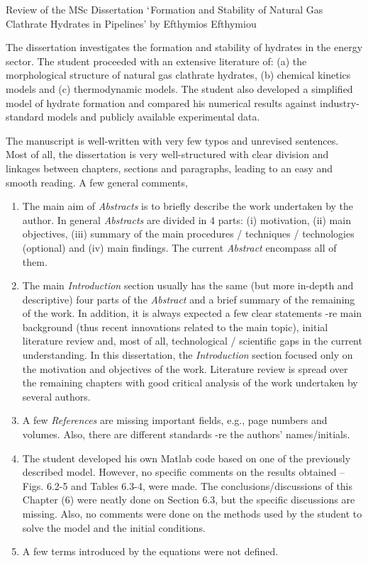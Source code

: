 \documentclass[14pt,twoside]{report}
\begin{document}
\begin{center}
{\Large Review of the MSc Dissertation $\lq$Formation and Stability of Natural Gas Clathrate Hydrates in Pipelines' by Efthymios Efthymiou}
\end{center}

\medskip

The dissertation investigates the formation and stability of hydrates in the energy sector. The student proceeded with an extensive literature of: (a) the morphological structure of natural gas clathrate hydrates, (b) chemical kinetics models and (c) thermodynamic models. The student also developed a simplified model of hydrate formation and compared his numerical results against industry-standard models and publicly available experimental data.

The manuscript is well-written with very few typos and unrevised sentences. Most of all, the dissertation is very well-structured with clear division and linkages between chapters, sections and paragraphs, leading to an easy and smooth reading. A few general comments,
\begin{enumerate}
%
\item The main aim of {\it Abstracts} is to briefly describe the work undertaken by the author. In general {\it Abstracts} are divided in 4 parts: (i) motivation, (ii) main objectives, (iii) summary of the main procedures / techniques / technologies (optional) and (iv) main findings. The current {\it Abstract} encompass all of them.
%
\item The main {\it Introduction} section usually has the same (but more in-depth and descriptive) four parts of the {\it Abstract} and a brief summary of the remaining of the work. In addition, it is always expected a few clear statements -re main background (thus recent innovations related to the main topic), initial literature review and, most of all, technological / scientific gaps in the current understanding. In this dissertation, the {\it Introduction} section focused only on the motivation and objectives of the work. Literature review is spread over the remaining chapters with good critical analysis of the work undertaken by several authors. 
%
\item A few {\it References} are missing important fields, e.g., page numbers and volumes. Also, there are different standards -re the authors' names/initials.
%
\item The student developed his own Matlab code based on one of the previously described model. However, no specific comments on the results obtained -- Figs. 6.2-5 and Tables 6.3-4, were made. The conclusions/discussions of this Chapter (6) were neatly done on Section 6.3, but the specific discussions are missing. Also, no comments were done on the methods used by the student to solve the model and the initial conditions.
%
\item A few terms introduced by the equations were not defined. 
% 
\end{enumerate}
\end{document}
